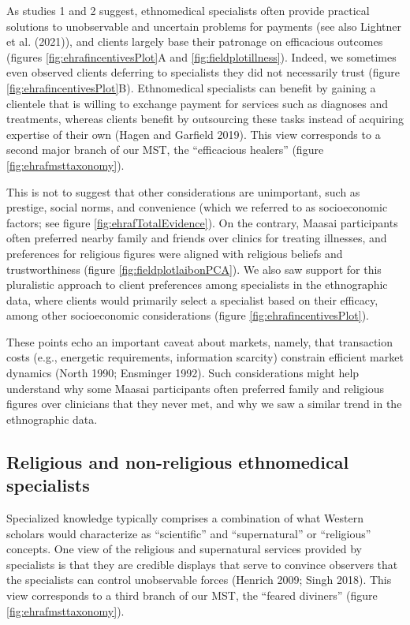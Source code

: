 \documentclass[
  11pt,
]{article}
\begin{document}
As studies 1 and 2 suggest, ethnomedical specialists often provide practical solutions to unobservable and uncertain problems for payments (see also Lightner et al. (2021)), and clients largely base their patronage on efficacious outcomes (figures \ref{fig:ehrafincentivesPlot}A and \ref{fig:fieldplotillness}). Indeed, we sometimes even observed clients deferring to specialists they did not necessarily trust (figure \ref{fig:ehrafincentivesPlot}B). Ethnomedical specialists can benefit by gaining a clientele that is willing to exchange payment for services such as diagnoses and treatments, whereas clients benefit by outsourcing these tasks instead of acquiring expertise of their own (Hagen and Garfield 2019). This view corresponds to a second major branch of our MST, the ``efficacious healers'' (figure \ref{fig:ehrafmsttaxonomy}).

This is not to suggest that other considerations are unimportant, such as prestige, social norms, and convenience (which we referred to as socioeconomic factors; see figure \ref{fig:ehrafTotalEvidence}). On the contrary, Maasai participants often preferred nearby family and friends over clinics for treating illnesses, and preferences for religious figures were aligned with religious beliefs and trustworthiness (figure \ref{fig:fieldplotlaibonPCA}). We also saw support for this pluralistic approach to client preferences among specialists in the ethnographic data, where clients would primarily select a specialist based on their efficacy, among other socioeconomic considerations (figure \ref{fig:ehrafincentivesPlot}).

These points echo an important caveat about markets, namely, that transaction costs (e.g., energetic requirements, information scarcity) constrain efficient market dynamics (North 1990; Ensminger 1992). Such considerations might help understand why some Maasai participants often preferred family and religious figures over clinicians that they never met, and why we saw a similar trend in the ethnographic data.

\hypertarget{religious-and-non-religious-ethnomedical-specialists}{%
\subsection{Religious and non-religious ethnomedical specialists}\label{religious-and-non-religious-ethnomedical-specialists}}

Specialized knowledge typically comprises a combination of what Western scholars would characterize as ``scientific'' and ``supernatural'' or ``religious'' concepts. One view of the religious and supernatural services provided by specialists is that they are credible displays that serve to convince observers that the specialists can control unobservable forces (Henrich 2009; Singh 2018). This view corresponds to a third branch of our MST, the ``feared diviners'' (figure \ref{fig:ehrafmsttaxonomy}).
\end{document}
